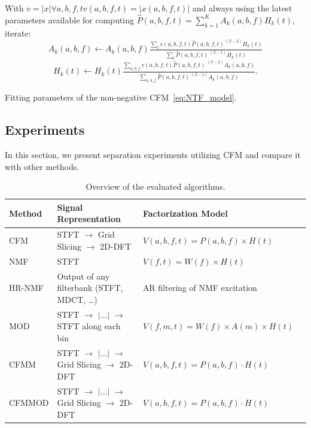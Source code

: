 \begin{algorithm}
With $v=\left|x\right| \forall a,b,f,t v(a,b,f,t) = |x(a,b,f,t)|$ and always using the latest
parameters available for computing
 $\hat{P}\left(a,b,f,t\right)=\sum\limits_{k=1}^{K}A_{k}\left(a,b,f\right)H_{k}\left(t\right)$,
iterate:
\[
A_{k}\left(a,b,f\right)\leftarrow A_{k}\left(a,b,f\right)\tfrac{\sum_{t}v\left(a,b,f,t\right)\hat{P}\left(a,b,f,t\right)^{\cdot\left(\beta-2\right)}H_{k}\left(t\right)}{\sum_{t}\hat{P}\left(a,b,f,t\right)^{\cdot\left(\beta-1\right)}H_{k}\left(t\right)}
\]
\[
H_{k}\left(t\right)\leftarrow H_{k}\left(t\right)\tfrac{\sum_{a,b,f}v\left(a,b,f,t\right)\hat{P}\left(a,b,f,t\right)^{\cdot\left(\beta-2\right)}A_{k}\left(a,b,f\right)}{\sum_{a,b,f}\hat{P}\left(a,b,f,t\right)^{\cdot\left(\beta-1\right)}A_{k}\left(a,b,f\right)}.
\]

\caption{Fitting parameters of the non-negative CFM~\eqref{eq:NTF_model}.\label{alg:Fitting-NTF}}
\end{algorithm}

\subsection{Experiments}
\label{sec:experiment}

In this section, we present separation experiments utilizing CFM and compare it with other methods.

\begin{table}[ht!]
  \centering
  \scriptsize
\begin{tabular}{ llll }
    \toprule
    Method & Signal Representation & Factorization Model \\
    \midrule
    CFM~\cite{stoter16} & STFT $\rightarrow$ Grid Slicing $\rightarrow$ 2D-DFT & $V(a,b,f,t) = P(a,b,f)\times H(t)$ \\
    NMF~\cite{virtanen07} & STFT & $V(f,t) = W(f)\times H(t)$ \\
    HR-NMF~\cite{badeau13} & Output of any filterbank (STFT, MDCT, \ldots)  & AR filtering of NMF excitation \\
    MOD~\cite{barker13} & STFT $\rightarrow$ $|\ldots|$ $\rightarrow$ STFT along each bin & $V(f,m,t) = W(f)\times A(m)\times H(t)$ \\
    CFMM & STFT $\rightarrow$ $|\ldots|$ $\rightarrow$ Grid Slicing $\rightarrow$ 2D-DFT & $V(a,b,f,t) = P(a,b,f)\cdot H(t)$ \\
    CFMMOD & STFT $\rightarrow$ $|\ldots|$ $\rightarrow$ Grid Slicing $\rightarrow$ 2D-DFT & $V(a,b,f,t) = P(a,b,f)\cdot H(t)$ \\
    \bottomrule
\end{tabular}
\caption{Overview of the evaluated algorithms.}
\label{tab:methods}
\end{table}

